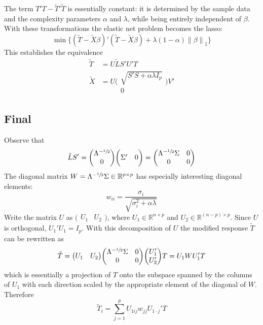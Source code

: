 \documentclass[a4paper]{article}
\newcommand{\nrm}[1]{{\left\| #1 \right \|}}
\newcommand{\Real}{\mathbb{R}}
\begin{document}
The term $T'T - \tilde{T}'\tilde{T}$ is essentially constant: it is determined by the sample data and the complexity parameters $\alpha$ and $\lambda$, while being entirely independent of $\beta$. With these transformations the elastic net problem becomes the lasso:
\[\min\Big\{ (\tilde{T} - \tilde{X}\beta)'(\tilde{T} - \tilde{X}\beta) + \lambda(1-\alpha)\nrm{\beta}_1 \Big\}\]
This establishes the equivalence
\begin{align*}
	\tilde{T} &= U\tilde{L}S'U'T\\
	\tilde{X} &= U\bigg(\begin{matrix} \sqrt{S'S+\alpha \lambda I_p} \\ 0 \end{matrix}\bigg) V'
\end{align*}


\subsection*{Final} %
\label{sub:final}

Observe that 
\[\tilde{L}S' = \bigg(\begin{matrix}\Lambda^{-\sfrac{1}{2}} \\ 0\end{matrix}\bigg) \bigg(\begin{matrix} \Sigma' & 0 \end{matrix}\bigg) = \bigg(\begin{matrix} \Lambda^{-\sfrac{1}{2}}\Sigma & 0 \\ 0 & 0\end{matrix}\bigg)\]
The diagonal matrix $W = \Lambda^{-\sfrac{1}{2}}\Sigma \in \Real^{p\times p}$ has especially interesting diagonal elements:
\[w_{ii} = \frac{\sigma_i}{\sqrt{ \sigma_i^2 + \alpha\lambda } }\]
Write the matrix $U$ as $\big(\begin{matrix}U_1 & U_2\end{matrix}\big)$, where $U_1\in \Real^{n\times p}$ and $U_2\in \Real^{(n-p)\times p}$.
Since $U$ is orthogonal, $U_1'U_1 = I_p$. With this decomposition of $U$ the modified response $\tilde{T}$ can be rewritten as
\[\tilde{T} = \big(\begin{matrix}U_1 & U_2\end{matrix}\big)\bigg(\begin{matrix} \Lambda^{-\sfrac{1}{2}}\Sigma & 0 \\ 0 & 0\end{matrix}\bigg)\bigg(\begin{matrix}U_1' \\ U_2'\end{matrix}\bigg)T = U_1 W U_1'T \]
which is essentially a projection of $T$ onto the subspace spanned by the columns of $U_1$ with each direction scaled by the appropriate element of the diagonal of $W$. Therefore
\[\tilde{T}_i = \sum_{j=1}^p U_{1ij} w_{jj} U_{1\cdot j}'T\]


\end{document}
